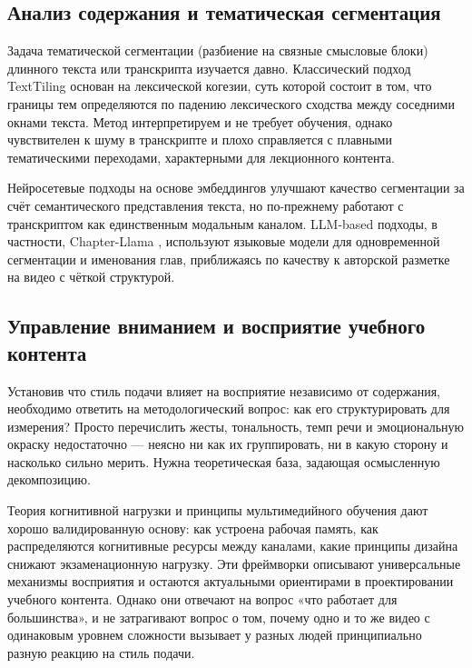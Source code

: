 \subsection{Анализ содержания и тематическая сегментация}
\label{subsec:content-analysis-segmentation}

Задача тематической сегментации (разбиение на связные смысловые блоки) длинного текста или транскрипта изучается давно.
Классический подход TextTiling \cite{hearst1997texttiling} основан на лексической когезии, суть которой состоит в том, что
границы тем определяются по падению лексического сходства между соседними окнами текста. Метод интерпретируем и не требует обучения,
однако чувствителен к шуму в транскрипте и плохо справляется с плавными тематическими переходами, характерными для лекционного контента.

Нейросетевые подходы на основе эмбеддингов улучшают качество сегментации за счёт семантического представления текста,
но по-прежнему работают с транскриптом как единственным модальным каналом.
LLM-based подходы, в частности, Chapter-Llama \cite{ventura2025chapterllama}, используют языковые модели для одновременной сегментации и именования глав,
приближаясь по качеству к авторской разметке на видео с чёткой структурой.

\subsection{Управление вниманием и восприятие учебного контента}
\label{subsec:psychological-functions-flags}


Установив что стиль подачи влияет на восприятие независимо от содержания, необходимо ответить на методологический вопрос:
как его структурировать для измерения? Просто перечислить жесты, тональность, темп речи и эмоциональную окраску недостаточно — неясно ни как их группировать,
ни в какую сторону и насколько сильно мерить. Нужна теоретическая база, задающая осмысленную декомпозицию.

Теория когнитивной нагрузки \cite{sweller1988cognitive} и принципы мультимедийного обучения \cite{mayer2009multimedia} дают хорошо валидированную основу:
как устроена рабочая память, как распределяются когнитивные ресурсы между каналами, какие принципы дизайна снижают экзаменационную нагрузку.
Эти фреймворки описывают универсальные механизмы восприятия и остаются актуальными ориентирами в проектировании учебного контента.
Однако они отвечают на вопрос «что работает для большинства», и не затрагивают вопрос о том,
почему одно и то же видео с одинаковым уровнем сложности вызывает у разных людей принципиально разную реакцию на стиль подачи.

